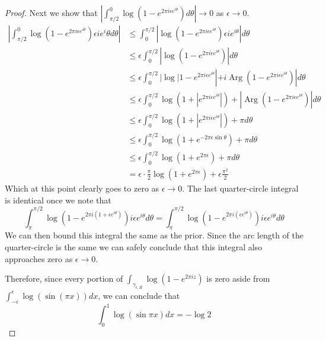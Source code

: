 \documentclass[10pt]{article}
\newcommand{\sk}{\vskip 10mm}
\DeclareMathOperator{\Arg}{Arg}
\theoremstyle{remark}
\theoremstyle{remark}
\begin{document}
\begin{proof}
  Next we show that $|\int_{\pi/2}^0\log(1-e^{2\pi i \epsilon e^{i\theta}}) d\theta|\rightarrow 0$ as $\epsilon\rightarrow 0$.
  \begin{align*}
    |\int_{\pi/2}^0\log(1-e^{2\pi i \epsilon e^{i\theta}}) \epsilon ie^i\theta d\theta| &\leq \int_0^{\pi/2}|\log(1-e^{2\pi i \epsilon e^{i\theta}})\epsilon ie^{i\theta}|d\theta\\
                                                       &\leq\epsilon\int_0^{\pi/2}|\log(1-e^{2\pi i \epsilon e^{i\theta}})|d\theta\\
                                           &\leq \epsilon\int_0^{\pi/2}|\log|1-e^{2\pi i \epsilon e^{i\theta}}|+i\Arg(1-e^{2\pi i \epsilon e^{i\theta}})|d\theta\\
                                                       &\leq \epsilon\int_0^{\pi/2}\log(1+|e^{2\pi i\epsilon e^{i\theta}}|)+|\Arg(1-e^{2\pi i \epsilon e^{i\theta}})|d\theta\\
                                                       &\leq\epsilon\int_0^{\pi/2}\log(1+|e^{2\pi i\epsilon e^{i\theta}}|)+\pi d\theta\\
                                                       &\leq\epsilon\int_0^{\pi/2}\log(1+e^{-2\pi \epsilon\sin\theta})+\pi d\theta\\
                                                       &\leq\epsilon\int_0^{\pi/2}\log(1+e^{2\pi \epsilon})+\pi d\theta\\
                                                       &= \epsilon\cdot\frac{\pi}{2}\log(1+e^{2\pi\epsilon})+\epsilon\frac{\pi^2}{2}
  \end{align*}
  Which at this point clearly goes to zero as $\epsilon\rightarrow 0$. The last quarter-circle integral is identical
  once we note that
  \[
    \int_{\pi}^{\pi/2}\log(1-e^{2\pi i(1+\epsilon e^{i\theta})})i\epsilon e^{i\theta}d\theta =  \int_{\pi}^{\pi/2}\log(1-e^{2\pi i(\epsilon e^{i\theta})})i\epsilon e^{i\theta}d\theta
  \]
  We can then bound this integral the same as the prior. Since the arc length of the quarter-circle
  is the same we can safely conclude that this integral also approaches zero as $\epsilon\rightarrow 0$.

  Therefore, since every portion of $\int_{\gamma_{\epsilon,R}}\log(1-e^{2\pi i z})$ is zero aside from
  $\int_{-\epsilon}^\epsilon\log(\sin(\pi x))dx$, we can conclude that
  \[
    \int_0^1\log(\sin\pi x)dx = -\log 2
  \]
\end{proof}

\sk
\end{document}
